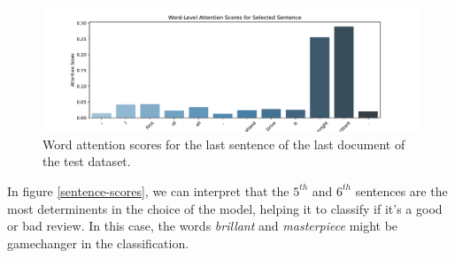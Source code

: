 \documentclass[a4paper]{article}
\begin{document}
\begin{figure}[H]
    \centering
    \includegraphics[width=.7\linewidth]{../figures/word_attention_scores.pdf}
    \caption{Word attention scores for the last sentence of the last document of the test dataset.}
    \label{word-scores}    
\end{figure}


\noindent
In figure \ref{sentence-scores}, we can interpret that the $5^{th}$ and $6^{th}$ sentences are the most determinents
in the choice of the model, helping it to classify if it's a good or bad review. In this case, the words
\textit{brillant} and \textit{masterpiece} might be gamechanger in the classification.  
\\
\\
\cite{vaswani2017attention}



\end{document}
